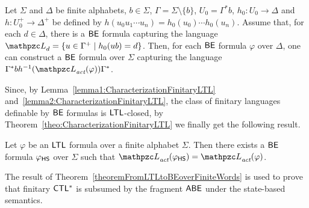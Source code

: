   \begin{lemma}\label{lemma2:CharacterizationFinitaryLTL}Let $\Sigma$ and $\Delta$ be finite alphabets,
  $b\in \Sigma$, $\Gamma=\Sigma\setminus\{b\}$, $U_0= \Gamma^{*}b$, $h_0:U_0 \rightarrow \Delta$ and $h:U_0^{+} \rightarrow \Delta^{+}$ be defined by
    $h(u_0u_1\cdots u_n)=h_0(u_0)\cdots h_0(u_n)$. Assume that, for each $d\in \Delta$, there is a $\mathsf{BE}$ formula capturing the language $\Lang_d =\{u\in \Gamma^{+}\mid h_0(ub)= d\}$.  Then, for each $\mathsf{BE}$ formula $\varphi$ over $\Delta$, one can construct a $\mathsf{BE}$ formula over $\Sigma$
    capturing
    the language $\Gamma^{*}b h^{-1}(\Lang_\act(\varphi))\Gamma^{*}$.
  \end{lemma}

Since, by Lemma~\ref{lemma1:CharacterizationFinitaryLTL} and~\ref{lemma2:CharacterizationFinitaryLTL}, the class of finitary languages definable by $\mathsf{BE}$ formulas is $\text{\sffamily LTL}$-closed, by Theorem~\ref{theo:CharacterizationFinitaryLTL} we finally get the following result.

\begin{theorem}\label{theoremFromLTLtoBEoverFiniteWords} Let $\varphi$ be an $\text{\sffamily LTL}$ formula over a finite alphabet $\Sigma$. Then there exists a $\mathsf{BE}$ formula
 $\varphi_{\text{\sffamily HS}}$ over $\Sigma$ such that $\Lang_\act(\varphi_\HS) =\Lang_\act(\varphi)$.
\end{theorem}



 The result of Theorem~\ref{theoremFromLTLtoBEoverFiniteWords} is used to prove that finitary $\text{\sffamily CTL$^{*}$}$ is subsumed by the fragment $\mathsf{A}\mathsf{B}\mathsf{E}$ under the state-based semantics.


